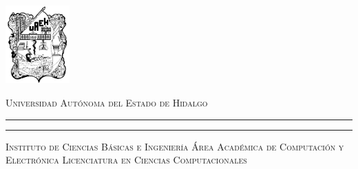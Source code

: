 \documentclass[11pt,letterpaper]{book}
\begin{document}
\newpage
\thispagestyle{empty}

	\begin{minipage}[c][0.2\textheight][c]{0.2\textwidth}
		\begin{center}
			\includegraphics[height=3cm]{Images/Logo_uaeh.png}
		\end{center}
	\end{minipage}
	\begin{minipage}[c][0.1\textheight][t]{0.65\textwidth}
		\begin{center}
			{\scshape Universidad Autónoma del Estado de Hidalgo}
			\vspace{.3cm}
			\hrule height2.5pt
			\vspace{.1cm}
			\hrule height1pt
			\vspace{.3cm}
			{\scshape Instituto de Ciencias Básicas e Ingeniería}
			\vspace{.3cm}
			{\scshape Área Académica de Computación y Electrónica}
			\vspace{.3cm}
			{\scshape Licenciatura en Ciencias Computacionales}
		\end{center}
	\end{minipage}
	
\end{document}
